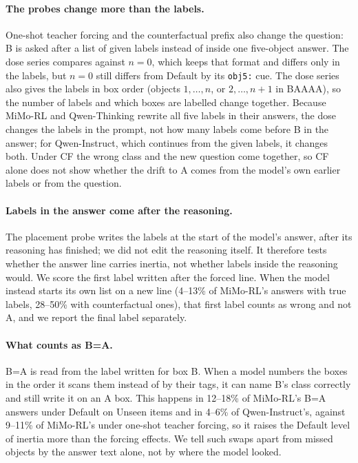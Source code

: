 \paragraph{The probes change more than the labels.} One-shot teacher forcing and the counterfactual
prefix also change the question: B is asked after a list of given labels instead of inside one
five-object answer. The dose series compares against $n=0$, which keeps that format and differs only
in the labels, but $n=0$ still differs from Default by its \texttt{obj5:} cue. The dose series also
gives the labels in box order (objects $1,\dots,n$, or $2,\dots,n+1$ in BAAAA), so the number of
labels and which boxes are labelled change together. Because MiMo-RL and Qwen-Thinking rewrite all
five labels in their answers, the dose changes the labels in the prompt, not how many labels come
before B in the answer;
for Qwen-Instruct, which continues from the given labels, it changes both. Under CF the wrong class and the new question
come together, so CF alone does not show whether the drift to A comes from the model's own earlier
labels or from the question.

\paragraph{Labels in the answer come after the reasoning.} The placement probe writes the labels at
the start of the model's answer, after its reasoning has finished; we did not edit the reasoning
itself. It therefore tests whether the answer line carries inertia, not whether labels inside the
reasoning would. We score the first label written after the forced line. When the model instead
starts its own list on a new line (4--13\% of MiMo-RL's answers with true labels, 28--50\% with
counterfactual ones), that first label counts as wrong and not A, and we report the final label
separately.

\paragraph{What counts as B=A.} B=A is read from the label written for box B. When a model numbers
the boxes in the order it scans them instead of by their tags, it can name B's class correctly and
still write it on an A box. This happens in 12--18\% of MiMo-RL's B=A answers under Default on
Unseen items and in 4--6\% of Qwen-Instruct's, against 9--11\% of MiMo-RL's under one-shot teacher
forcing, so it raises the Default level of inertia more than the forcing effects. We tell such
swaps apart from missed objects by the answer text alone, not by where the model looked.

